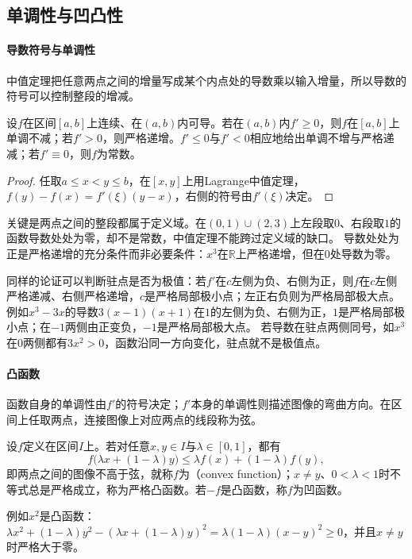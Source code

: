\subsection{单调性与凹凸性}
\label{sec:ru-monotonicity-convexity}
\label{sec:analysis-monotonicity}

\paragraph{导数符号与单调性}
中值定理把任意两点之间的增量写成某个内点处的导数乘以输入增量，所以导数的符号可以控制整段的增减。
\begin{theorem}[导数符号与单调性]
\label{thm:analysis-derivative-monotonicity}
设$f$在区间$[a,b]$上连续、在$(a,b)$内可导。若在$(a,b)$内$f'\geq0$，则$f$在$[a,b]$上单调不减；若$f'>0$，则严格递增。$f'\leq0$与$f'<0$相应地给出单调不增与严格递减；若$f'\equiv0$，则$f$为常数。
\end{theorem}
\begin{proof}
任取$a\leq x<y\leq b$，在$[x,y]$上用Lagrange中值定理，$f(y)-f(x)=f'(\xi)(y-x)$，右侧的符号由$f'(\xi)$决定。
\end{proof}
关键是两点之间的整段都属于定义域。在$(0,1)\cup(2,3)$上左段取$0$、右段取$1$的函数导数处处为零，却不是常数，中值定理不能跨过定义域的缺口。
导数处处为正是严格递增的充分条件而非必要条件：$x^3$在$\mathbb R$上严格递增，但在$0$处导数为零。

同样的论证可以判断驻点是否为极值：若$f'$在$c$左侧为负、右侧为正，则$f$在$c$左侧严格递减、右侧严格递增，$c$是严格局部极小点；左正右负则为严格局部极大点。
例如$x^3-3x$的导数$3(x-1)(x+1)$在$1$的左侧为负、右侧为正，$1$是严格局部极小点；在$-1$两侧由正变负，$-1$是严格局部极大点。
若导数在驻点两侧同号，如$x^3$在$0$两侧都有$3x^2>0$，函数沿同一方向变化，驻点就不是极值点。

\paragraph{凸函数}
函数自身的单调性由$f'$的符号决定；$f'$本身的单调性则描述图像的弯曲方向。在区间上任取两点，连接图像上对应两点的线段称为弦。
\begin{definition}[凸函数]
\label{def:ru-convex-function}
设$f$定义在区间$I$上。若对任意$x,y\in I$与$\lambda\in[0,1]$，都有
\[
 f\bigl(\lambda x+(1-\lambda)y\bigr)\leq\lambda f(x)+(1-\lambda)f(y),
\]
即两点之间的图像不高于弦，就称$f$为（convex function）；$x\neq y$、$0<\lambda<1$时不等式总是严格成立，称为严格凸函数。若$-f$是凸函数，称$f$为凹函数。
\end{definition}
例如$x^2$是凸函数：$\lambda x^2+(1-\lambda)y^2-(\lambda x+(1-\lambda)y)^2=\lambda(1-\lambda)(x-y)^2\geq0$，并且$x\neq y$时严格大于零。

